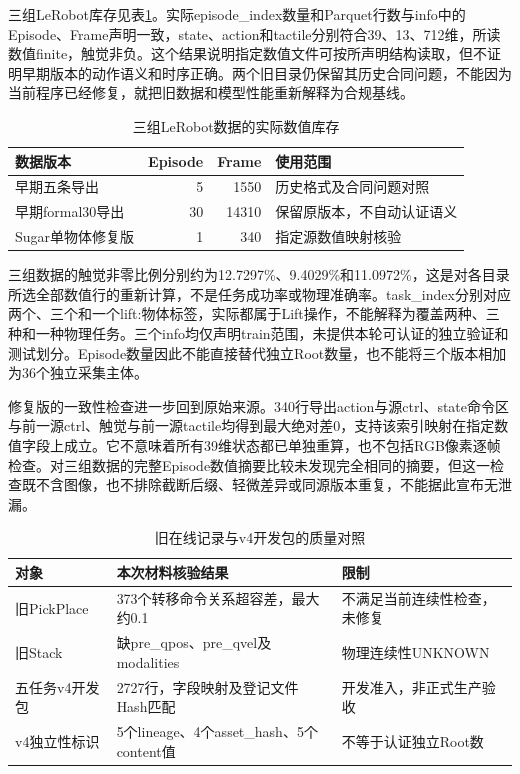 三组LeRobot库存见表\ref{tab:ch04_lerobot_inventory}。实际episode\_index数量和Parquet行数与info中的Episode、Frame声明一致，state、action和tactile分别符合39、13、712维，所读数值finite，触觉非负。这个结果说明指定数值文件可按所声明结构读取，但不证明早期版本的动作语义和时序正确。两个旧目录仍保留其历史合同问题，不能因为当前程序已经修复，就把旧数据和模型性能重新解释为合规基线。

\begin{table}[htbp]
 \centering\small
 \caption{三组LeRobot数据的实际数值库存}
 \label{tab:ch04_lerobot_inventory}
 \begin{tabular}{p{}rrp{}}
 \hline
 数据版本 & Episode & Frame & 使用范围\\
 \hline
 早期五条导出 & 5 & 1550 & 历史格式及合同问题对照\\
 早期formal30导出 & 30 & 14310 & 保留原版本，不自动认证语义\\
 Sugar单物体修复版 & 1 & 340 & 指定源数值映射核验\\
 \hline
 \end{tabular}
\end{table}

三组数据的触觉非零比例分别约为12.7297\%、9.4029\%和11.0972\%，这是对各目录所选全部数值行的重新计算，不是任务成功率或物理准确率。task\_index分别对应两个、三个和一个lift:物体标签，实际都属于Lift操作，不能解释为覆盖两种、三种和一种物理任务。三个info均仅声明train范围，未提供本轮可认证的独立验证和测试划分。Episode数量因此不能直接替代独立Root数量，也不能将三个版本相加为36个独立采集主体。

修复版的一致性检查进一步回到原始来源。340行导出action与源ctrl、state命令区与前一源ctrl、触觉与前一源tactile均得到最大绝对差0，支持该索引映射在指定数值字段上成立。它不意味着所有39维状态都已单独重算，也不包括RGB像素逐帧检查。对三组数据的完整Episode数值摘要比较未发现完全相同的摘要，但这一检查既不含图像，也不排除截断后缀、轻微差异或同源版本重复，不能据此宣布无泄漏。

\begin{table}[htbp]
 \centering\small
 \caption{旧在线记录与v4开发包的质量对照}
 \label{tab:ch04_version_quality}
 \begin{tabular}{p{}p{}p{}}
 \hline
 对象 & 本次材料核验结果 & 限制\\
 \hline
 旧PickPlace & 373个转移命令关系超容差，最大约0.1 & 不满足当前连续性检查，未修复\\
 旧Stack & 缺pre\_qpos、pre\_qvel及modalities & 物理连续性UNKNOWN\\
 五任务v4开发包 & 2727行，字段映射及登记文件Hash匹配 & 开发准入，非正式生产验收\\
 v4独立性标识 & 5个lineage、4个asset\_hash、5个content值 & 不等于认证独立Root数\\
 \hline
 \end{tabular}
\end{table}

